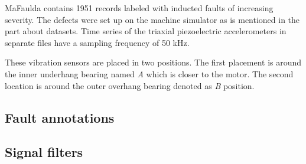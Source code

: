 
MaFaulda contains 1951 records labeled with inducted faults of increasing severity. The defects were set up on the machine simulator as is mentioned in the part about datasets. Time series of the triaxial piezoelectric accelerometers in separate files have a sampling frequency of 50 kHz. 

These vibration sensors are placed in two positions. The first placement is around the inner underhang bearing named \emph{A} which is closer to the motor. The second location is around the outer overhang bearing denoted as \emph{B} position.

\subsection{Fault annotations}

\subsection{Signal filters}


